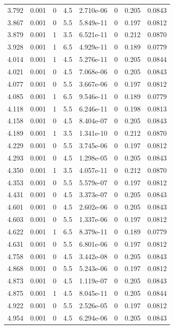 \documentclass[preview]{standalone}
\begin{document}
{{{\begin{tabular}{L{1.2cm}C{1.2cm} C{0.3cm}C{0.5cm} C{1.4cm}C{1.4cm} C{1.4cm}C{1.4cm}}
  3.792  &  0.001  & 0     & 4.5 &  2.710e-06  & 0  & 0.205 &  0.0843   \\ 
  3.867  &  0.001  & 0     & 5.5 &  5.849e-11  & 0  & 0.197 &  0.0812   \\ 
  3.879  &  0.001  & 1     & 3.5 &  6.521e-11  & 0  & 0.212 &  0.0870   \\ 
  3.928  &  0.001  & 1     & 6.5 &  4.929e-11  & 0  & 0.189 &  0.0779   \\ 
  4.014  &  0.001  & 1     & 4.5 &  5.276e-11  & 0  & 0.205 &  0.0844   \\ 
  4.021  &  0.001  & 0     & 4.5 &  7.068e-06  & 0  & 0.205 &  0.0843   \\ 
  4.077  &  0.001  & 0     & 5.5 &  3.667e-06  & 0  & 0.197 &  0.0812   \\ 
  4.085  &  0.001  & 1     & 6.5 &  9.546e-11  & 0  & 0.189 &  0.0779   \\ 
  4.118  &  0.001  & 1     & 5.5 &  6.246e-11  & 0  & 0.198 &  0.0813   \\ 
  4.158  &  0.001  & 0     & 4.5 &  8.404e-07  & 0  & 0.205 &  0.0843   \\ 
  4.189  &  0.001  & 1     & 3.5 &  1.341e-10  & 0  & 0.212 &  0.0870   \\ 
  4.229  &  0.001  & 0     & 5.5 &  3.745e-06  & 0  & 0.197 &  0.0812   \\ 
  4.293  &  0.001  & 0     & 4.5 &  1.298e-05  & 0  & 0.205 &  0.0843   \\ 
  4.350  &  0.001  & 1     & 3.5 &  4.057e-11  & 0  & 0.212 &  0.0870   \\ 
  4.353  &  0.001  & 0     & 5.5 &  5.579e-07  & 0  & 0.197 &  0.0812   \\ 
  4.431  &  0.001  & 0     & 4.5 &  3.373e-07  & 0  & 0.205 &  0.0843   \\ 
  4.601  &  0.001  & 0     & 4.5 &  2.602e-06  & 0  & 0.205 &  0.0843   \\ 
  4.603  &  0.001  & 0     & 5.5 &  1.337e-06  & 0  & 0.197 &  0.0812   \\ 
  4.622  &  0.001  & 1     & 6.5 &  8.379e-11  & 0  & 0.189 &  0.0779   \\ 
  4.631  &  0.001  & 0     & 5.5 &  6.801e-06  & 0  & 0.197 &  0.0812   \\ 
  4.758  &  0.001  & 0     & 4.5 &  3.442e-08  & 0  & 0.205 &  0.0843   \\ 
  4.868  &  0.001  & 0     & 5.5 &  5.243e-06  & 0  & 0.197 &  0.0812   \\ 
  4.873  &  0.001  & 0     & 4.5 &  1.119e-07  & 0  & 0.205 &  0.0843   \\ 
  4.875  &  0.001  & 1     & 4.5 &  8.045e-11  & 0  & 0.205 &  0.0844   \\ 
  4.922  &  0.001  & 0     & 5.5 &  2.526e-05  & 0  & 0.197 &  0.0812   \\ 
  4.954  &  0.001  & 0     & 4.5 &  6.294e-06  & 0  & 0.205 &  0.0843   \\ 
\hline 
\end{tabular} 

}}}
\end{document}
